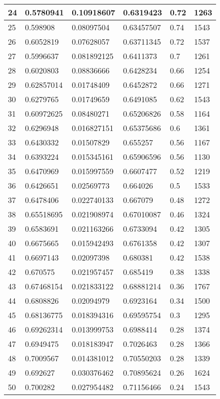 \begin{longtable}{|l|l|l|l|l|l|}
24 & 0.5780941 & 0.10918607 & 0.6319423 & 0.72 & 1263 \\ \hline 
25 & 0.598908 & 0.08097504 & 0.63457507 & 0.74 & 1543 \\ \hline 
26 & 0.6052819 & 0.07628057 & 0.63711345 & 0.72 & 1537 \\ \hline 
27 & 0.5996637 & 0.081892125 & 0.6411373 & 0.7 & 1261 \\ \hline 
28 & 0.6020803 & 0.08836666 & 0.6428234 & 0.66 & 1254 \\ \hline 
29 & 0.62857014 & 0.01748409 & 0.6452872 & 0.66 & 1271 \\ \hline 
30 & 0.6279765 & 0.01749659 & 0.6491085 & 0.62 & 1543 \\ \hline 
31 & 0.60972625 & 0.08480271 & 0.65206826 & 0.58 & 1164 \\ \hline 
32 & 0.6296948 & 0.016827151 & 0.65375686 & 0.6 & 1361 \\ \hline 
33 & 0.6430332 & 0.01507829 & 0.655257 & 0.56 & 1167 \\ \hline 
34 & 0.6393224 & 0.015345161 & 0.65906596 & 0.56 & 1130 \\ \hline 
35 & 0.6470969 & 0.015997559 & 0.6607477 & 0.52 & 1219 \\ \hline 
36 & 0.6426651 & 0.02569773 & 0.664026 & 0.5 & 1533 \\ \hline 
37 & 0.6478406 & 0.022740133 & 0.667079 & 0.48 & 1272 \\ \hline 
38 & 0.65518695 & 0.021908974 & 0.67010087 & 0.46 & 1324 \\ \hline 
39 & 0.6583691 & 0.021163266 & 0.6733094 & 0.42 & 1305 \\ \hline 
40 & 0.6675665 & 0.015942493 & 0.6761358 & 0.42 & 1307 \\ \hline 
41 & 0.6697143 & 0.02097398 & 0.680381 & 0.42 & 1538 \\ \hline 
42 & 0.670575 & 0.021957457 & 0.685419 & 0.38 & 1338 \\ \hline 
43 & 0.67468154 & 0.021833122 & 0.68881214 & 0.36 & 1767 \\ \hline 
44 & 0.6808826 & 0.02094979 & 0.6923164 & 0.34 & 1500 \\ \hline 
45 & 0.68136775 & 0.018394316 & 0.69595754 & 0.3 & 1295 \\ \hline 
46 & 0.69262314 & 0.013999753 & 0.6988414 & 0.28 & 1374 \\ \hline 
47 & 0.6949475 & 0.018183947 & 0.7026463 & 0.28 & 1366 \\ \hline 
48 & 0.7009567 & 0.014381012 & 0.70550203 & 0.28 & 1339 \\ \hline 
49 & 0.692627 & 0.030376462 & 0.70895624 & 0.26 & 1624 \\ \hline 
50 & 0.700282 & 0.027954482 & 0.71156466 & 0.24 & 1543 \\ \hline 
\end{longtable}